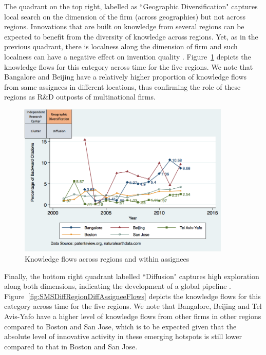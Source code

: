 \documentclass[12pt,letterpaper]{article}
\begin{document}
The quadrant on the top right, labelled as ``Geographic Diversification" captures local search on the dimension of the firm (across geographies) but not across regions. Innovations that are built on knowledge from several regions can be expected to benefit from the diversity of knowledge across regions. Yet, as in the previous quadrant, there is localness along the dimension of firm and such localness can have a negative effect on invention quality \citep{Rosenkopf2001}. Figure~\ref{fig:SMSDiffRegionSameAssigneeFlows} depicts the  knowledge flows for this category across time for the five regions. We note that Bangalore and Beijing have a relatively higher proportion of knowledge flows from same assignees in different locations, thus confirming the role of these regions as R\&D outposts of multinational firms.\par

\begin{figure}[h!]
\begin{centering}
  \caption{Knowledge flows across regions and within assignees}
  \label{fig:SMSDiffRegionSameAssigneeFlows}
  \includegraphics[width=0.90\textwidth]{SMSDiffRegionSameAssigneeFlows}
\end{centering}
\end{figure}

Finally, the bottom right quadrant labelled ``Diffusion" captures high exploration along both dimensions, indicating the development of a global pipeline \citep*{Bathelt2004}. Figure~\ref{fig:SMSDiffRegionDiffAssigneeFlows} depicts the  knowledge flows for this category across time for the five regions. We note that Bangalore, Beijing and Tel Avis-Yafo have a higher level of knowledge flows from other firms in other regions compared to Boston and San Jose, which is to be expected given that the absolute level of innovative activity in these emerging hotspots is still lower compared to that in Boston and San Jose. \par
\end{document}
